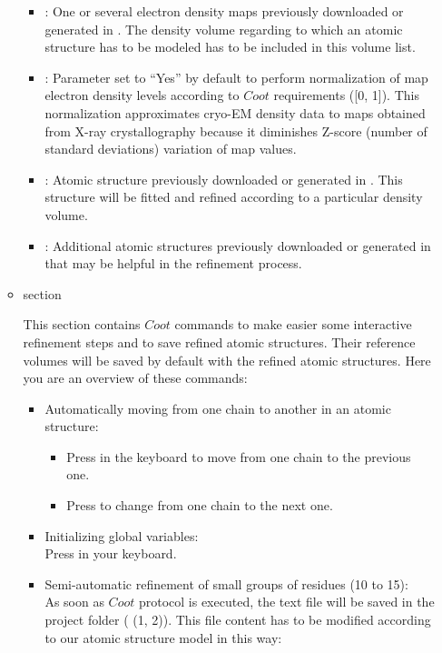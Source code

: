 \begin{itemize}
\begin{itemize}
    \begin{itemize}
     \item {}: One or several electron density maps previously downloaded or generated in \scipion. The density volume regarding to which an atomic structure has to be modeled has to be included in this volume list.
     \item {}: Parameter set to ``Yes'' by default to perform normalization of map electron density levels according to $Coot$ requirements ([0, 1]). This normalization approximates cryo-EM density data to maps obtained from X-ray crystallography because it diminishes Z-score (number of standard deviations) variation of map values.  
     \item {}: Atomic structure previously downloaded or generated in \scipion. This structure will be fitted and refined according to a particular density volume.
     \item {}: Additional atomic structures previously downloaded or generated in \scipion that may be helpful in the refinement process.
    \end{itemize}
    \item {} section
    
    This section contains $Coot$ commands to make easier some interactive refinement steps and to save refined atomic structures. Their reference volumes will be saved by default with the refined atomic structures. Here you are an overview of these commands:
    \begin{itemize}
     \item Automatically moving from one chain to another in an atomic structure:
     \begin{itemize}
      \item Press  in the keyboard to move from one chain to the previous one.
      \item Press  to change from one chain to the next one.
     \end{itemize} 
     \item Initializing global variables:\\
     Press  in your keyboard.
     \item Semi-automatic refinement of small groups of residues (10 to 15):\\As soon as $Coot$ protocol is executed, the text file  will be saved in the project folder  ( (1, 2)). This file content has to be modified according to our atomic structure model in this way:
     \begin{itemize}


\end{itemize}
\end{itemize}
\end{itemize}
\end{itemize}
